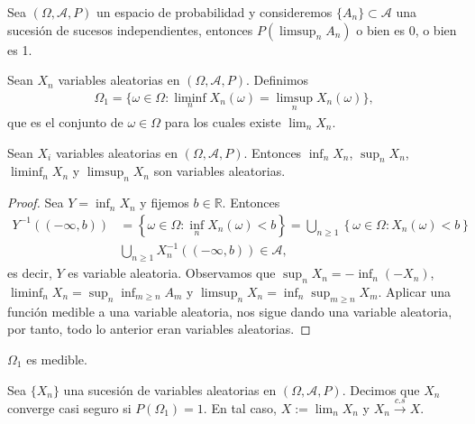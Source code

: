 \begin{cor}
    Sea $(\Omega,\mathcal{A},P)$ un espacio de probabilidad y consideremos $\{A_n\} \subset \mathcal{A}$ una sucesión de sucesos independientes, entonces $P\left( \limsup_n A_n\right)$ o bien es 0, o bien es 1.
\end{cor}
Sean $X_n$ variables aleatorias en $(\Omega, \mathcal{A}, P)$. Definimos
\begin{align*}
    \Omega_1 = \{ \omega \in \Omega : \liminf_n X_n(\omega) = \limsup_n X_n(\omega) \},
\end{align*}
que es el conjunto de $\omega \in \Omega$ para los cuales existe $\lim_n X_n$.

\begin{teo}
    Sean $X_i$ variables aleatorias en $(\Omega, \mathcal{A}, P)$. Entonces $\inf_n X_n$, $\sup_n X_n$, \newline $\liminf_n X_n$ y $\limsup_n X_n$ son variables aleatorias.
\end{teo}

\begin{proof}
    Sea $Y = \inf_n X_n$ y fijemos $b \in \mathbb{R}$. Entonces
    \begin{align*}
        Y^{-1}((-\infty,b)) & = \left\{ \omega \in \Omega : \inf_n X_n(\omega) < b  \right\} = \bigcup_{n \ge 1} \left\{ \omega \in \Omega : X_n(\omega) < b  \right\} \\
                            & \bigcup_{n \ge 1} X_n^{-1}((-\infty,b)) \in \mathcal{A},
    \end{align*}
    es decir, $Y$ es variable aleatoria. Observamos que $\sup_n X_n = - \inf_{n} (-X_n)$, \newline$\liminf_n X_n = \sup_n \inf_{m \ge n} A_m$ y $\limsup_n X_n = \inf_n \sup_{m \ge n} X_m$. Aplicar una función medible a una variable aleatoria, nos sigue dando una variable aleatoria, por tanto, todo lo anterior eran variables aleatorias.
\end{proof}

\begin{cor}
    $\Omega_1$ es medible.
\end{cor}

\begin{defi}
    Sea $\{X_n\}$ una sucesión de variables aleatorias en $(\Omega, \mathcal{A}, P)$. Decimos que $X_n$ converge casi seguro si $P(\Omega_1) = 1$. En tal caso, $X:= \lim_n X_n$ y $X_n \xrightarrow[]{c.s} X$.
\end{defi}

